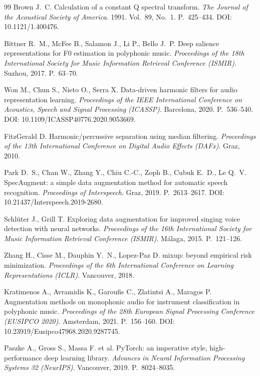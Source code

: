 \begin{thebibliography}{99}
Brown J.~C.
Calculation of a constant Q spectral transform.
\textit{The Journal of the Acoustical Society of America}.
1991.
Vol.~89, No.~1.
P.~425--434.
DOI: 10.1121/1.400476.

Bittner R.~M., McFee B., Salamon J., Li P., Bello J.~P.
Deep salience representations for F0 estimation in polyphonic music.
\textit{Proceedings of the 18th International Society for Music Information Retrieval Conference (ISMIR)}.
Suzhou, 2017.
P.~63--70.

Won M., Chun S., Nieto O., Serra X.
Data-driven harmonic filters for audio representation learning.
\textit{Proceedings of the IEEE International Conference on Acoustics, Speech and Signal Processing (ICASSP)}.
Barcelona, 2020.
P.~536--540.
DOI: 10.1109/ICASSP40776.2020.9053669.

FitzGerald D.
Harmonic/percussive separation using median filtering.
\textit{Proceedings of the 13th International Conference on Digital Audio Effects (DAFx)}.
Graz, 2010.

Park D.~S., Chan W., Zhang Y., Chiu C.-C., Zoph B., Cubuk E.~D., Le Q.~V.
SpecAugment: a simple data augmentation method for automatic speech recognition.
\textit{Proceedings of Interspeech}.
Graz, 2019.
P.~2613--2617.
DOI: 10.21437/Interspeech.2019-2680.

Schl{\"u}ter J., Grill T.
Exploring data augmentation for improved singing voice detection with neural networks.
\textit{Proceedings of the 16th International Society for Music Information Retrieval Conference (ISMIR)}.
M{\'a}laga, 2015.
P.~121--126.

Zhang H., Cisse M., Dauphin Y.~N., Lopez-Paz D.
mixup: beyond empirical risk minimization.
\textit{Proceedings of the 6th International Conference on Learning Representations (ICLR)}.
Vancouver, 2018.

Kratimenos A., Avramidis K., Garoufis C., Zlatintsi A., Maragos P.
Augmentation methods on monophonic audio for instrument classification in polyphonic music.
\textit{Proceedings of the 28th European Signal Processing Conference (EUSIPCO 2020)}.
Amsterdam, 2021.
P.~156--160.
DOI: 10.23919/Eusipco47968.2020.9287745.

Paszke A., Gross S., Massa F. et al.
PyTorch: an imperative style, high-performance deep learning library.
\textit{Advances in Neural Information Processing Systems 32 (NeurIPS)}.
Vancouver, 2019.
P.~8024--8035.

\end{thebibliography}
